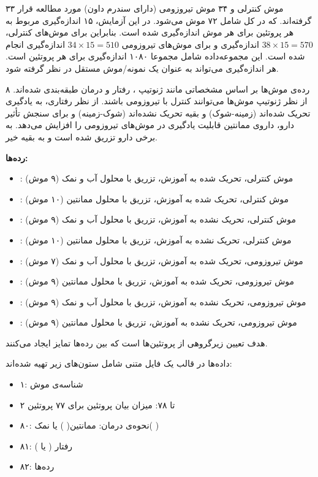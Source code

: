 ۳۳ موش کنترلی و ۳۴ موش تیروزومی
(دارای سندرم داون) مورد مطالعه قرار گرفته‌اند. که در کل شامل ۷۲ موش می‌شود. در این آزمایش، ۱۵ اندازه‌گیری مربوط به هر پروتئین برای هر موش اندازه‌گیری شده است. بنابراین برای موش‌های کنترلی، 
$38 \times 15 = 570$
اندازه‌گیری و برای موش‌های تیروزومی 
$34 \times 15 = 510$
اندازه‌گیری انجام شده است. این مجموعه‌داده شامل مجموعا ۱۰۸۰ اندازه‌گیری برای هر پروتئین است. هر اندازه‌گیری می‌تواند به عنوان یک نمونه/موش مستقل در نظر گرفته شود.

۸ رده‌ی موش‌ها بر اساس مشخصاتی مانند ژنوتیپ
، رفتار و درمان طبقه‌بندی شده‌اند. از نظر ژنوتیپ موش‌ها می‌توانند کنترل با تیروزومی باشند. از نظر رفتاری، به یادگیری تحریک شده‌اند (زمینه-شوک)
 و بقیه تحریک نشده‌اند (شوک-زمینه) و برای سنجش تأثیر دارو، داروی ممانتین%
قابلیت یادگیری در موش‌های تیروزومی را افزایش می‌دهد. به برخی دارو تزریق شده است و به بقیه خیر.

\textbf{
رده‌ها:
}

\begin{itemize}
\item
{}
: موش کنترلی، تحریک شده به آموزش، تزریق با محلول آب و نمک (۹ موش)
\item
{}
: موش کنترلی، تحریک شده به آموزش، تزریق با محلول ممانتین (۱۰ موش)
\item
{}
: موش کنترلی، تحریک نشده به آموزش، تزریق با محلول آب و نمک (۹ موش)
\item
{}
: موش کنترلی، تحریک نشده به آموزش، تزریق با محلول ممانتین (۱۰ موش)
\item
{}
: موش تیروزومی، تحریک شده به آموزش، تزریق با محلول آب و نمک (۷ موش)
\item
{}
: موش تیروزومی، تحریک شده به آموزش، تزریق با محلول ممانتین (۹ موش)
\item
{}
: موش تیروزومی، تحریک نشده به آموزش، تزریق با محلول آب و نمک (۹ موش)
\item
{}
: موش تیروزومی، تحریک نشده به آموزش، تزریق با محلول ممانتین (۹ موش)
\end{itemize}

هدف تعیین زیر‌گروهی از پروتئین‌ها است که بین رده‌ها تمایز ایجاد می‌کنند.

داده‌ها در قالب یک فایل متنی شامل ستون‌های زیر تهیه شده‌اند:

\begin{itemize}
\item
۱: شناسه‌ی موش
\item
۲ تا ۷۸: میزان بیان پروتئین برای ۷۷ پروتئین
\item
۸۰: نحوه‌ی درمان: ممانتین(%
%
) یا نمک(%
%
)
\item
۸۱: رفتار (%
یا 
%
)
\item
۸۲: رده‌ها
\end{itemize}





